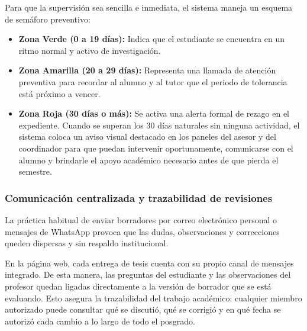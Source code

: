 Para que la supervisión sea sencilla e inmediata, el sistema maneja un esquema de semáforo preventivo:
\begin{itemize}
    \item \textbf{Zona Verde (0 a 19 días):} Indica que el estudiante se encuentra en un ritmo normal y activo de investigación.
    \item \textbf{Zona Amarilla (20 a 29 días):} Representa una llamada de atención preventiva para recordar al alumno y al tutor que el periodo de tolerancia está próximo a vencer.
    \item \textbf{Zona Roja (30 días o más):} Se activa una alerta formal de rezago en el expediente. Cuando se superan los 30 días naturales sin ninguna actividad, el sistema coloca un aviso visual destacado en los paneles del asesor y del coordinador para que puedan intervenir oportunamente, comunicarse con el alumno y brindarle el apoyo académico necesario antes de que pierda el semestre.
\end{itemize}

\subsubsection{Comunicación centralizada y trazabilidad de revisiones}
La práctica habitual de enviar borradores por correo electrónico personal o mensajes de WhatsApp provoca que las dudas, observaciones y correcciones queden dispersas y sin respaldo institucional. 

En la página web, cada entrega de tesis cuenta con su propio canal de mensajes integrado. De esta manera, las preguntas del estudiante y las observaciones del profesor quedan ligadas directamente a la versión de borrador que se está evaluando. Esto asegura la trazabilidad del trabajo académico: cualquier miembro autorizado puede consultar qué se discutió, qué se corrigió y en qué fecha se autorizó cada cambio a lo largo de todo el posgrado.